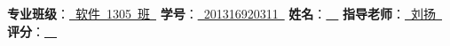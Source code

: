 \newcommand{\ctli}[2]{{\bf #1}：\underline{{~#2~}}\hfill}

\begin{center}

{\bfseries{}}

\vspace*{1em}

{\small
\ctli{专业班级}{软件~1305~班}
\ctli{学号}{201316920311}
\ctli{姓名}{\tjf}
\ctli{指导老师}{刘扬}
\ctli{评分}{\qquad\qquad}
}

\end{center}

\part{\titlec}

